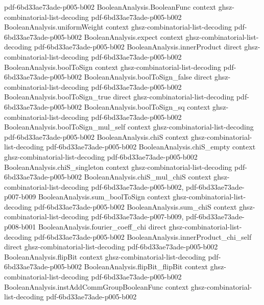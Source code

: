 \begin{lemma}
  {pdf-6bd33ae73ade-p005-b002}
\proofstep
  {BooleanAnalysis.BooleanFunc}
  {context}
  {ghsz-combinatorial-list-decoding}
  {pdf-6bd33ae73ade-p005-b002}
\proofstep
  {BooleanAnalysis.uniformWeight}
  {context}
  {ghsz-combinatorial-list-decoding}
  {pdf-6bd33ae73ade-p005-b002}
\proofstep
  {BooleanAnalysis.expect}
  {context}
  {ghsz-combinatorial-list-decoding}
  {pdf-6bd33ae73ade-p005-b002}
\proofstep
  {BooleanAnalysis.innerProduct}
  {direct}
  {ghsz-combinatorial-list-decoding}
  {pdf-6bd33ae73ade-p005-b002}
\proofstep
  {BooleanAnalysis.boolToSign}
  {context}
  {ghsz-combinatorial-list-decoding}
  {pdf-6bd33ae73ade-p005-b002}
\proofstep
  {BooleanAnalysis.boolToSign_false}
  {direct}
  {ghsz-combinatorial-list-decoding}
  {pdf-6bd33ae73ade-p005-b002}
\proofstep
  {BooleanAnalysis.boolToSign_true}
  {direct}
  {ghsz-combinatorial-list-decoding}
  {pdf-6bd33ae73ade-p005-b002}
\proofstep
  {BooleanAnalysis.boolToSign_sq}
  {context}
  {ghsz-combinatorial-list-decoding}
  {pdf-6bd33ae73ade-p005-b002}
\proofstep
  {BooleanAnalysis.boolToSign_mul_self}
  {context}
  {ghsz-combinatorial-list-decoding}
  {pdf-6bd33ae73ade-p005-b002}
\proofstep
  {BooleanAnalysis.chiS}
  {context}
  {ghsz-combinatorial-list-decoding}
  {pdf-6bd33ae73ade-p005-b002}
\proofstep
  {BooleanAnalysis.chiS_empty}
  {context}
  {ghsz-combinatorial-list-decoding}
  {pdf-6bd33ae73ade-p005-b002}
\proofstep
  {BooleanAnalysis.chiS_singleton}
  {context}
  {ghsz-combinatorial-list-decoding}
  {pdf-6bd33ae73ade-p005-b002}
\proofstep
  {BooleanAnalysis.chiS_mul_chiS}
  {context}
  {ghsz-combinatorial-list-decoding}
  {pdf-6bd33ae73ade-p005-b002,
    pdf-6bd33ae73ade-p007-b009}
\proofstep
  {BooleanAnalysis.sum_boolToSign}
  {context}
  {ghsz-combinatorial-list-decoding}
  {pdf-6bd33ae73ade-p005-b002}
\proofstep
  {BooleanAnalysis.sum_chiS}
  {context}
  {ghsz-combinatorial-list-decoding}
  {pdf-6bd33ae73ade-p007-b009,
    pdf-6bd33ae73ade-p008-b001}
\proofstep
  {BooleanAnalysis.fourier_coeff_chi}
  {direct}
  {ghsz-combinatorial-list-decoding}
  {pdf-6bd33ae73ade-p005-b002}
\proofstep
  {BooleanAnalysis.innerProduct_chi_self}
  {direct}
  {ghsz-combinatorial-list-decoding}
  {pdf-6bd33ae73ade-p005-b002}
\proofstep
  {BooleanAnalysis.flipBit}
  {context}
  {ghsz-combinatorial-list-decoding}
  {pdf-6bd33ae73ade-p005-b002}
\proofstep
  {BooleanAnalysis.flipBit_flipBit}
  {context}
  {ghsz-combinatorial-list-decoding}
  {pdf-6bd33ae73ade-p005-b002}
\proofstep
  {BooleanAnalysis.instAddCommGroupBooleanFunc}
  {context}
  {ghsz-combinatorial-list-decoding}
  {pdf-6bd33ae73ade-p005-b002}
\proofstep

\end{lemma}

